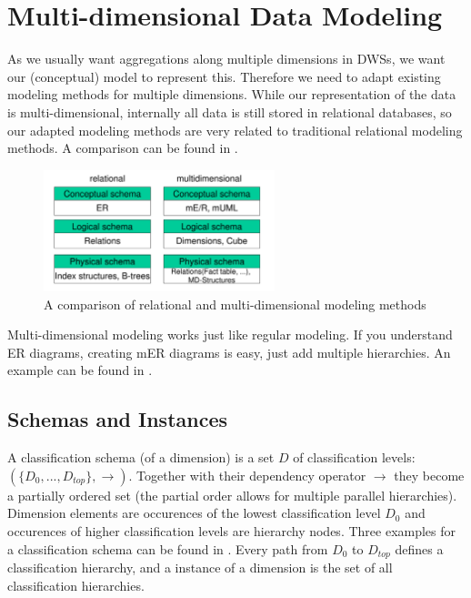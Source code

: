\documentclass{article}
\begin{document}
\section{Multi-dimensional Data Modeling}
As we usually want aggregations along multiple dimensions in DWSs, we want our (conceptual) model to represent this.
Therefore we need to adapt existing modeling methods for multiple dimensions.
While our representation of the data is multi-dimensional, internally all data is still stored in relational databases, so our adapted modeling methods are very related to traditional relational modeling methods.
A comparison can be found in .

\begin{figure}[h]
    \centering
    \includegraphics[width=0.6\textwidth]{modeling.png}
    \caption{A comparison of relational and multi-dimensional modeling methods}
    \label{fig:modeling}
\end{figure}

\begin{keypointbox}
    Multi-dimensional modeling works just like regular modeling.
    If you understand ER diagrams, creating mER diagrams is easy, just add multiple hierarchies.
    An example can be found in .
\end{keypointbox}

\subsection{Schemas and Instances}
A classification schema (of a dimension) is a set $D$ of classification levels: $(\{D_0, ..., D_{top}\}, \rightarrow)$.
Together with their dependency operator $\rightarrow$ they become a partially ordered set (the partial order allows for multiple parallel hierarchies).
Dimension elements are occurences of the lowest classification level $D_0$ and occurences of higher classification levels are hierarchy nodes.
Three examples for a classification schema can be found in .
Every path from $D_0$ to $D_{top}$ defines a classification hierarchy, and a instance of a dimension is the set of all classification hierarchies.
\end{document}
